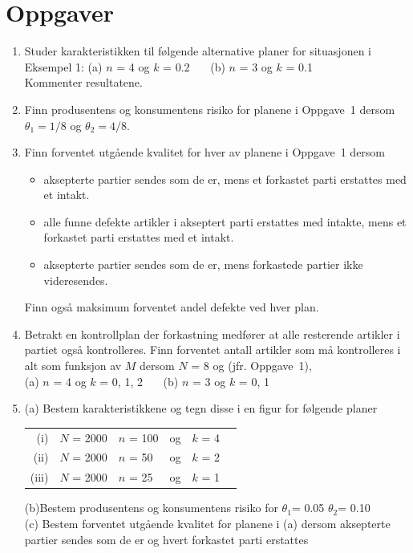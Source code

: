 \section{Oppgaver}
\small
\begin{enumerate}
\item
Studer karakteristikken til følgende alternative planer for
situasjonen i Eksempel 1:
 (a) $n$ = 4 og $k$ = 0.2 \ \ \ (b) $n$ = 3 og $k$ = 0.1 \\
Kommenter resultatene.
\item
Finn produsentens og konsumentens risiko for planene i Oppgave~1 dersom
${\theta}_1 = 1/8$ og ${\theta}_2 = 4/8$.
\item
Finn forventet utgående kvalitet for hver av planene i Oppgave~1 dersom 
 \begin{itemize}
 \item[(a)] aksepterte partier sendes som de er, mens et forkastet parti 
    erstattes med et intakt.
 \item[(b)] alle funne defekte artikler i akseptert parti erstattes med intakte,
    mens et forkastet parti erstattes med et intakt.
 \item[(c)] aksepterte partier sendes som de er, mens forkastede partier ikke
    videresendes.
 \end{itemize}Finn også maksimum forventet andel defekte ved hver plan.
\item
Betrakt en kontrollplan der forkastning medfører at alle resterende
artikler i partiet også kontrolleres.  Finn forventet antall artikler
som må kontrolleres i alt som funksjon av $M$ dersom $N$ = 8 og
(jfr. Oppgave~1),\\
(a) $n$ = 4 og $k$ = 0, 1, 2 \ \ \ (b) $n$ = 3 og $k$ = 0, 1
\item
 (a) Bestem karakteristikkene og tegn disse i en figur for følgende planer
\begin{center}
\begin{tabular}{rclccc}
      (i) & $N$ = 2000 & $n$ = 100 & og & $k$ = 4 \\
     (ii) & $N$ = 2000 & $n$ = 50  & og & $k$ = 2 \\
    (iii) & $N$ = 2000 & $n$ = 25  & og & $k$ = 1 
\end{tabular}
\end{center}
 (b)Bestem produsentens og konsumentens risiko for
    ${\theta}_1$= 0.05   ${\theta}_2$= 0.10 \\
 (c) Bestem forventet utgående kvalitet for planene i (a) dersom aksepterte
\indent partier sendes som de er og hvert forkastet parti erstattes

\end{enumerate}

